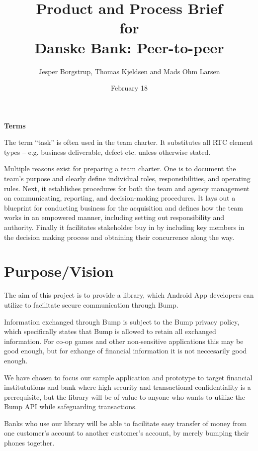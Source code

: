 \documentclass[a4paper,11pt]{article}
\title{Product and Process Brief\\\small{for}\\\small{Danske Bank: Peer-to-peer}}
\author{ Jesper Borgstrup, Thomas Kjeldsen and Mads Ohm Larsen }
\date{February 18}
\begin{document}
\ifpdf
{}
\else
{}
\fi

\maketitle

\tableofcontents
\vspace{2cm}

\noindent\textbf{Terms}

The term ``task'' is often used in the team charter. 
It substitutes all RTC element types – e.g. business deliverable, defect etc. unless otherwise stated.

\pagebreak
Multiple reasons exist for preparing a team charter. One is to document the team's purpose and clearly define individual roles, responsibilities, and operating rules. Next, it establishes procedures for both the team and agency management on communicating, reporting, and decision-making procedures. It lays out a blueprint for conducting business for the acquisition and defines how the team works in an empowered manner, including setting out responsibility and authority. Finally it facilitates stakeholder buy in by including key members in the decision making process and obtaining their concurrence along the way. 

\section{Purpose/Vision} %
\label{sec:purpose_vision}

The aim of this project is to provide a library, which Android App developers can utilize to facilitate secure communication through Bump.

Information exchanged through Bump is subject to the Bump privacy policy, which specifically states that Bump is allowed to retain all exchanged information. For co-op games and other non-sensitive applications this may be good enough, but for exhange of financial information it is not neccesarily good enough.

We have chosen to focus our sample application and prototype to target financial institututions and bank where high security and transactional confidentiality is a prerequisite, but the library will be of value to anyone who wants to utilize the Bump API while safeguarding transactions.

Banks who use our library will be able to facilitate easy transfer of money from one customer's account to another customer's account, by merely bumping their phones together.
\end{document}
